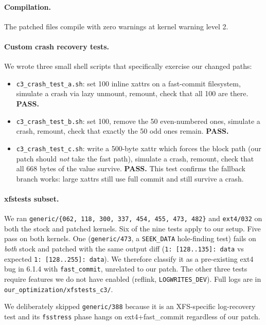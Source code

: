 \documentclass[11pt,a4paper]{article}
\begin{document}
\paragraph{Compilation.} The patched files compile with zero
warnings at kernel warning level 2.

\paragraph{Custom crash recovery tests.} We wrote three small shell
scripts that specifically exercise our changed paths:
\begin{itemize}[leftmargin=*]
  \item \texttt{c3\_crash\_test\_a.sh}: set 100 inline xattrs on a
        fast-commit filesystem, simulate a crash via lazy unmount,
        remount, check that all 100 are there. \textbf{PASS.}
  \item \texttt{c3\_crash\_test\_b.sh}: set 100, remove the 50
        even-numbered ones, simulate a crash, remount, check that
        exactly the 50 odd ones remain. \textbf{PASS.}
  \item \texttt{c3\_crash\_test\_c.sh}: write a 500-byte xattr
        which forces the block path (our patch should \emph{not}
        take the fast path), simulate a crash, remount, check that
        all 668 bytes of the value survive. \textbf{PASS.} This
        test confirms the fallback branch works: large xattrs still
        use full commit and still survive a crash.
\end{itemize}

\paragraph{xfstests subset.} We ran \texttt{generic/\{062, 118,
300, 337, 454, 455, 473, 482\}} and \texttt{ext4/032} on both the
stock and patched kernels. Six of the nine tests apply to our
setup. Five pass on both kernels. One
(\texttt{generic/473}, a \texttt{SEEK\_DATA} hole-finding test)
fails on \emph{both} stock and patched with the same output diff
(\texttt{1: [128..135]: data} vs expected \texttt{1: [128..255]:
data}). We therefore classify it as a pre-existing ext4 bug in
6.1.4 with \texttt{fast\_commit}, unrelated to our patch. The other
three tests require features we do not have enabled (reflink,
\texttt{LOGWRITES\_DEV}). Full logs are in
\texttt{our\_optimization/xfstests\_c3/}.

We deliberately skipped \texttt{generic/388} because it is an
XFS-specific log-recovery test and its \texttt{fsstress} phase hangs
on ext4+fast\_commit regardless of our patch.
\end{document}
